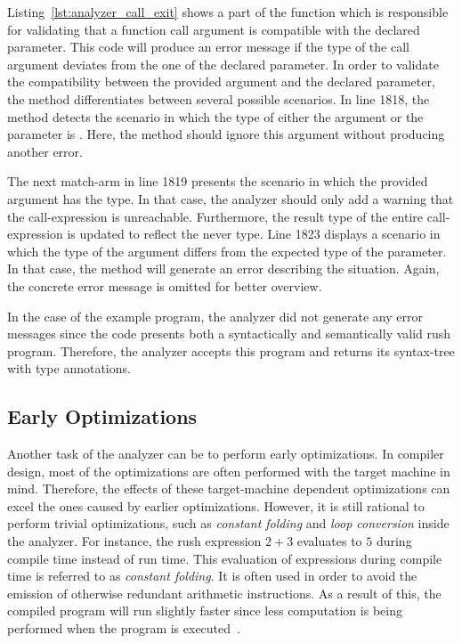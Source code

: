 
Listing~\ref{lst:analyzer_call_exit} shows a part of the  function which is responsible for validating that a function call argument is compatible with the declared parameter.
This code will produce an error message if the type of the call argument deviates from the one of the declared parameter.
In order to validate the compatibility between the provided argument and the declared parameter, the method differentiates between several possible scenarios.
In line 1818, the method detects the scenario in which the type of either the argument or the parameter is .
Here, the method should ignore this argument without producing another error.

The next match-arm in line 1819 presents the scenario in which the provided argument has the  type.
In that case, the analyzer should only add a warning that the call-expression is unreachable.
Furthermore, the result type of the entire call-expression is updated to reflect the never type.
Line 1823 displays a scenario in which the type of the argument differs from the expected type of the parameter.
In that case, the method will generate an error describing the situation.
Again, the concrete error message is omitted for better overview.

In the case of the example program, the analyzer did not generate any error messages since the code presents both a syntactically and semantically valid rush program.
Therefore, the analyzer accepts this program and returns its syntax-tree with type annotations.

\subsection{Early Optimizations}

Another task of the analyzer can be to perform early optimizations.
In compiler design, most of the optimizations are often performed with the target machine in mind.
Therefore, the effects of these target-machine dependent optimizations can excel the ones caused by earlier optimizations.
However, it is still rational to perform trivial optimizations, such as \emph{constant folding} and \emph{loop conversion} inside the analyzer.
For instance, the rush expression $2 + 3$ evaluates to $5$ during compile time instead of run time.
This evaluation of expressions during compile time is referred to as \emph{constant folding}.
It is often used in order to avoid the emission of otherwise redundant arithmetic instructions.
As a result of this, the compiled program will run slightly faster since less computation is being performed when the program is executed~\cite[p.~54]{wirth_compiler_construction_2005}.

